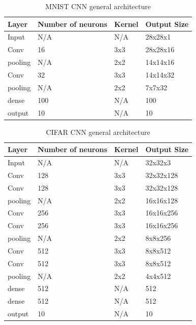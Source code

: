 \begin{table}[]
\centering
\begin{tabular}{|l|l|l|l|}
\hline
Layer   & Number of neurons & Kernel & Output Size \\ \hline
Input   &       N/A            &   N/A     &   28x28x1          \\ \hline
Conv    &    16               &   3x3     & 28x28x16            \\ \hline
pooling &      N/A             &   2x2     &    14x14x16         \\ \hline
Conv    &      32             &  3x3       &      14x14x32          \\ \hline
pooling &      N/A             &   2x2     &    7x7x32         \\ \hline
dense   &       100            &    N/A     &     100        \\ \hline
output   &       10            &    N/A     &     10        \\ \hline
\end{tabular}
\caption{MNIST CNN general architecture}
   \label{table:MNIST_CNN_arch}
\end{table}

\begin{table}[]
\centering
\begin{tabular}{|l|l|l|l|}
\hline
Layer   & Number of neurons & Kernel & Output Size \\ \hline
Input   &       N/A            &   N/A     &   32x32x3          \\ \hline
Conv    &    128               &   3x3     & 32x32x128         \\ \hline
Conv    &      128             &  3x3       &     32x32x128        \\ \hline
pooling &      N/A             &   2x2     &    16x16x128         \\ \hline
Conv    &    256               &   3x3     & 16x16x256             \\ \hline
Conv    &      256             &  3x3       &     16x16x256          \\ \hline
pooling &      N/A             &   2x2     &    8x8x256         \\ \hline
Conv    &    512               &   3x3     &  8x8x512           \\ \hline
Conv    &      512             &  3x3       &       8x8x512           \\ \hline
pooling &      N/A             &   2x2     &    4x4x512          \\ \hline
dense   &       512            &    N/A     &     512        \\ \hline
dense   &       512            &    N/A     &     512        \\ \hline
output   &       10            &    N/A     &     10        \\ \hline
\end{tabular}
\caption{CIFAR CNN general architecture}
   \label{table:CIFAR_CNN_arch}
   
\end{table}


